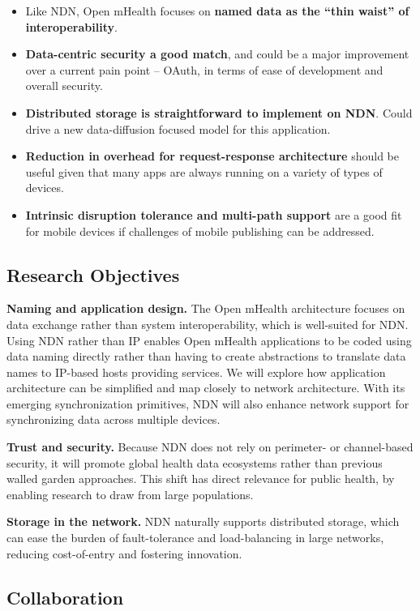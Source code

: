 \begin{itemize}
\item Like NDN, Open mHealth  focuses on \textbf{named data as the ``thin waist'' of interoperability}. 
\item \textbf{Data-centric security a good match}, and could be a major improvement over a current pain point – OAuth, in terms of ease of development and overall security.
\item \textbf{Distributed storage is straightforward to implement on NDN}. Could drive a new data-diffusion focused model for this application. 
\item \textbf{Reduction in overhead for request-response architecture} should be useful given that many apps are always running on a variety of types of devices. 
\item \textbf{Intrinsic disruption tolerance and multi-path support} are a good fit for mobile devices if challenges of mobile publishing can be addressed. 
\end{itemize}

\subsection{Research Objectives} 

{\bf Naming and application design.} The Open mHealth architecture focuses on data exchange rather than system interoperability, which is well-suited for NDN. Using NDN rather than IP enables Open mHealth applications to be coded using data naming directly rather than having to create abstractions to translate data names to IP-based hosts providing services. We will explore how application architecture can be simplified and map closely to network architecture. With its emerging synchronization primitives, NDN will also enhance network support for synchronizing data across multiple devices. 

{\bf Trust and security.} Because NDN does not rely on perimeter- or channel-based security, it will promote global health data ecosystems rather than previous walled garden approaches.   This shift has direct relevance for public health, by enabling research to draw from large populations. 

{\bf Storage in the network.} NDN naturally supports distributed storage, which can ease the burden of fault-tolerance and load-balancing in large networks, reducing cost-of-entry and fostering innovation. 

\subsection{Collaboration}


